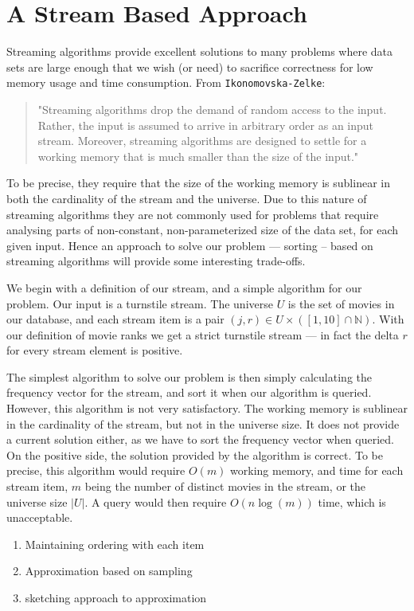 \section*{A Stream Based Approach}
Streaming algorithms provide excellent solutions to many problems where data
sets are large enough that we wish (or need) to sacrifice correctness for low
memory usage and time consumption.
From \texttt{Ikonomovska\--Zelke}:
\begin{quote}
"Streaming algorithms drop the demand of random access to the input. Rather, the input
is assumed to arrive in arbitrary order as an input stream. Moreover, streaming algorithms
are designed to settle for a working memory that is much smaller than the size
of the input."
\end{quote}
To be precise, they require that the size of the working memory is sublinear in both the cardinality of the stream and the universe.
Due to this nature of streaming algorithms they are not commonly used for
problems that require analysing parts of non-constant, non-parameterized size
of the data set, for each given input. Hence an approach to
solve our problem --- sorting -- based on streaming algorithms will provide some interesting
trade-offs.

We begin with a definition of our stream, and a simple algorithm for our
problem. Our input is a turnstile stream. The universe
$U$ is the set of movies in our database, and each stream item is a pair
$(j,r) \in U\times \left(\left[1,10\right]\cap \mathbb{N}\right)$.
With our definition of movie ranks we get a strict turnstile stream --- 
in fact the delta $r$ for every stream element is positive.

The simplest algorithm to solve our problem is then simply calculating the
frequency vector for the stream, and sort it when our algorithm is queried.
However, this algorithm is not very satisfactory. The working memory is
sublinear in the cardinality of the stream, but not in the universe size. It
does not provide a current solution either, as we have to sort the frequency
vector when queried. On the positive side, the solution provided by the
algorithm is correct. To be precise, this algorithm would require $O(m)$ working
memory, and time for each stream item, $m$ being the number of distinct movies
in the stream, or the universe size $|U|$. A query would then require
$O(n \log(m))$ time, which is unacceptable.

\begin{enumerate}
	\item{Maintaining ordering with each item}
	\item{Approximation based on sampling}
	\item{sketching approach to approximation}
\end{enumerate}

